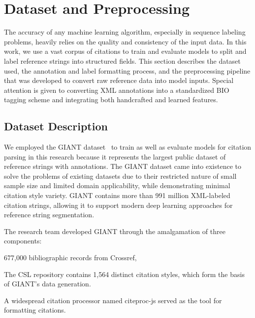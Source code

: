 \section{Dataset and Preprocessing}
The accuracy of any machine learning algorithm, especially in sequence labeling problems, heavily relies on the quality and consistency of the input data. In this work, we use a vast corpus of citations to train and evaluate models to split and label reference strings into structured fields. This section describes the dataset used, the annotation and label formatting process, and the preprocessing pipeline that was developed to convert raw reference data into model inputs. Special attention is given to converting XML annotations into a standardized BIO tagging scheme and integrating both handcrafted and learned features.

\subsection{Dataset Description}
We employed the GIANT dataset~\cite{giant} to train as well as evaluate models for citation parsing in this research because it represents the largest public dataset of reference strings with annotations. The GIANT dataset came into existence to solve the problems of existing datasets due to their restricted nature of small sample size and limited domain applicability, while demonstrating minimal citation style variety. GIANT contains more than 991 million XML-labeled citation strings, allowing it to support modern deep learning approaches for reference string segmentation.

The research team developed GIANT through the amalgamation of three components:
\begin{compactitem}
\item 677,000 bibliographic records from Crossref,
\item The CSL repository contains 1,564 distinct citation styles, which form the basis of GIANT's data generation.
\item A widespread citation processor named citeproc-js served as the tool for formatting citations.
\end{compactitem}

